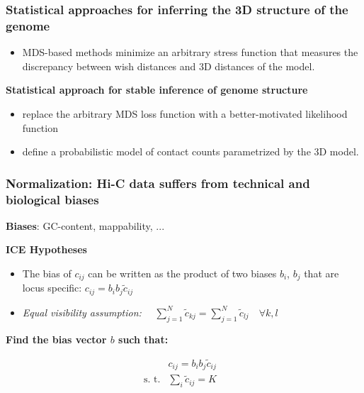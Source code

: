 \documentclass[xcolor=dvipsnames]{beamer}
\begin{document}
\begin{frame}
\frametitle{Statistical approaches for inferring the 3D structure of the
genome}
\begin{itemize}[label={$\bullet$}]

\item MDS-based methods minimize an arbitrary stress function that measures
the discrepancy between wish distances and 3D distances of the model.
\end{itemize}

\vspace{1em}

{\color{Blue} \textbf{Statistical approach for stable inference of genome
structure}} \\
\begin{itemize}[label={$\bullet$}]

\item replace the arbitrary MDS loss function with a better-motivated
likelihood function
\item define a probabilistic model of contact counts parametrized by the 3D
model.
\end{itemize}
\end{frame}

\begin{frame}
\frametitle{Normalization: Hi-C data suffers from technical and biological
biases}

\textbf{\color{Blue} Biases}: GC-content, mappability, ...

\vspace{1em}

\textbf{\color{Blue} ICE Hypotheses}

\begin{itemize}[label={$\bullet$}]

\item The bias of $c_{ij}$ can be written as the product of two biases $b_i$,
$b_j$ that are locus specific: $c_{ij} = b_i b_j \tilde{c}_{ij}$
\item \textit{Equal visibility assumption:}
$\quad \sum_{j=1}^N \tilde{c}_{kj} = \sum_{j=1}^N \tilde{c}_{lj} \quad \forall
k, l$
\end{itemize}

\vspace{1em}
\textbf{\color{Blue} Find the bias vector $b$ such that:}

\begin{equation*}
\begin{array}{lll}
 & c_{ij} = b_i b_j \tilde{c}_{ij} & \\
  \text{s. t.} & \sum_{i} \tilde{c}_{ij} = K& \\ 
  \end{array}
  \end{equation*}

  {\tiny \citep{imakaev:iterative}}
\end{frame}
\end{document}
